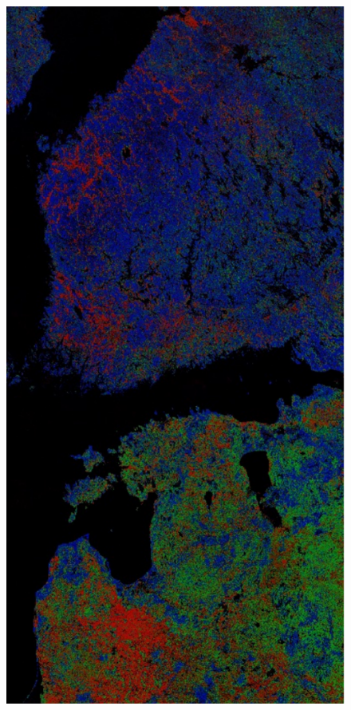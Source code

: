 \documentclass[20pt]{beamer}
\begin{document}
\begin{frame}{}
\begin{textblock}{7}
\begin{figure}
		  \includegraphics[width=2.3\TPHorizModule]{../thesis/thesis-figures/figures-qgis/fulltile-rf}

\end{figure}
\end{textblock}
\end{frame}
\end{document}
